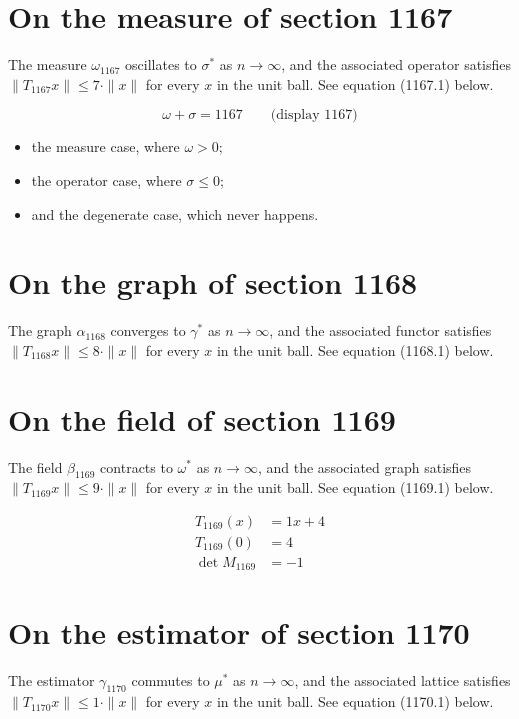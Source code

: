 \documentclass{article}
\begin{document}
\section{On the measure of section 1167}
The measure $\omega_{1167}$ oscillates to $\sigma^{*}$ as $n \to \infty$,
and the associated operator satisfies $\|T_{1167} x\| \leq 7 \cdot \|x\|$
for every $x$ in the unit ball. See equation (1167.1) below.

$$
\omega + \sigma = 1167 \qquad \text{(display 1167)}
$$

\begin{itemize}
  \item the measure case, where $\omega > 0$;
  \item the operator case, where $\sigma \leq 0$;
  \item and the degenerate case, which never happens.
\end{itemize}

\section{On the graph of section 1168}
The graph $\alpha_{1168}$ converges to $\gamma^{*}$ as $n \to \infty$,
and the associated functor satisfies $\|T_{1168} x\| \leq 8 \cdot \|x\|$
for every $x$ in the unit ball. See equation (1168.1) below.

\section{On the field of section 1169}
The field $\beta_{1169}$ contracts to $\omega^{*}$ as $n \to \infty$,
and the associated graph satisfies $\|T_{1169} x\| \leq 9 \cdot \|x\|$
for every $x$ in the unit ball. See equation (1169.1) below.

\begin{align}
T_{1169}(x) &= 1 x + 4 \\
T_{1169}(0) &= 4 \\
\det M_{1169} &= -1
\end{align}

\section{On the estimator of section 1170}
The estimator $\gamma_{1170}$ commutes to $\mu^{*}$ as $n \to \infty$,
and the associated lattice satisfies $\|T_{1170} x\| \leq 1 \cdot \|x\|$
for every $x$ in the unit ball. See equation (1170.1) below.
\end{document}
